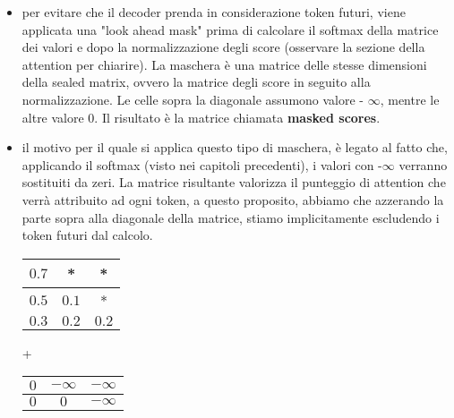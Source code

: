 \begin{itemize}
	\item per evitare che il decoder prenda in considerazione token futuri, viene applicata una "look ahead mask" prima di calcolare il softmax della matrice dei valori e dopo la normalizzazione degli score (osservare la sezione della attention per chiarire). La maschera è una matrice delle stesse dimensioni della sealed matrix, ovvero la matrice degli score in seguito alla normalizzazione. Le celle sopra la diagonale assumono valore - $\infty$, mentre le altre valore 0. Il risultato è la matrice chiamata \textbf{masked scores}. 
	\item il motivo per il quale si applica questo tipo di maschera, è legato al fatto che, applicando il softmax (visto nei capitoli precedenti), i valori con -$\infty$ verranno sostituiti da zeri. La matrice risultante valorizza il punteggio di attention che verrà attribuito ad ogni token, a questo proposito, abbiamo che azzerando la parte sopra alla diagonale della matrice, stiamo implicitamente escludendo i token futuri dal calcolo. 
	\\
	\begin{table}[h]                        %
			\begin{tabular}{r|c|c}                  %
				\hline \hline                           %
				$0.7$ & * & *\\           %
				\hline                                  %
				$0.5$ & $0.1$ & *\\           %
				\hline                                  %
				$0.3$ & $0.2$ & $0.2$\\
				\hline \hline                           %
			\end{tabular}
		+
					\begin{tabular}{r|c|c}                  %
			\hline \hline                           %
			$0$ & $-\infty$ & $ - \infty$\\           %
			\hline                                  %
			$0$ & $0$ & $-\infty$\\           %

\end{tabular}
\end{table}
\end{itemize}
